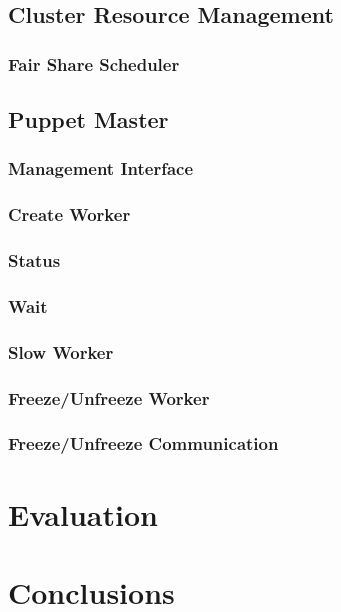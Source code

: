 \documentclass[times, 10pt,twocolumn]{article}
\begin{document}
    	\subsection{Cluster Resource Management}
    	
            \subsubsection{Fair Share Scheduler}
        
    	\subsection{Puppet Master}
        
            \subsubsection{Management Interface}
            
            \subsubsection{Create Worker}
            
            \subsubsection{Status}
                	
            \subsubsection{Wait}
            
            \subsubsection{Slow Worker}
            
            \subsubsection{Freeze/Unfreeze Worker}
            
            \subsubsection{Freeze/Unfreeze Communication}
	
	\section{Evaluation}
	
	\section{Conclusions}
	
	
	
\end{document}
